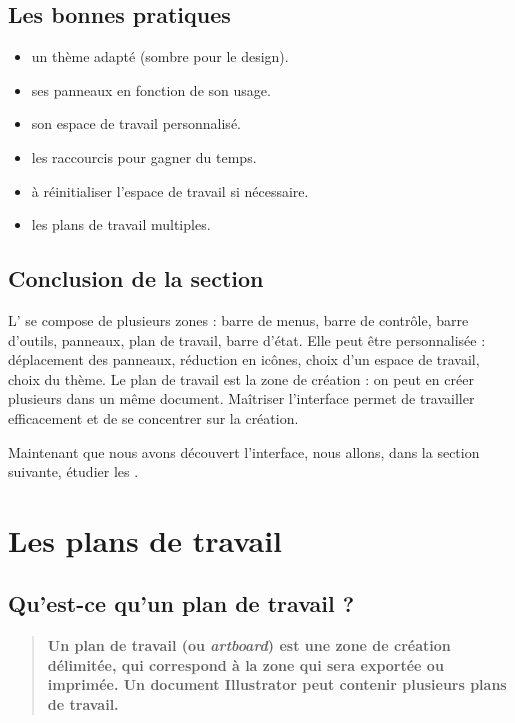 \subsection{Les bonnes pratiques}

\begin{itemize}
    \item {} un thème adapté (sombre pour le design).
    \item {} ses panneaux en fonction de son usage.
    \item {} son espace de travail personnalisé.
    \item {} les raccourcis pour gagner du temps.
    \item {} à réinitialiser l'espace de travail si nécessaire.
    \item {} les plans de travail multiples.
\end{itemize}

\subsection*{Conclusion de la section}

L' se compose de plusieurs zones : barre de menus, barre de contrôle, barre d'outils, panneaux, plan de travail, barre d'état. Elle peut être personnalisée : déplacement des panneaux, réduction en icônes, choix d'un espace de travail, choix du thème. Le plan de travail est la zone de création : on peut en créer plusieurs dans un même document. Maîtriser l'interface permet de travailler efficacement et de se concentrer sur la création.

Maintenant que nous avons découvert l'interface, nous allons, dans la section suivante, étudier les .

\section{Les plans de travail}

\subsection{Qu'est-ce qu'un plan de travail ?}

\begin{quote}
\textbf{Un plan de travail (ou \emph{artboard}) est une zone de création délimitée, qui correspond à la zone qui sera exportée ou imprimée. Un document Illustrator peut contenir plusieurs plans de travail.}
\end{quote}

